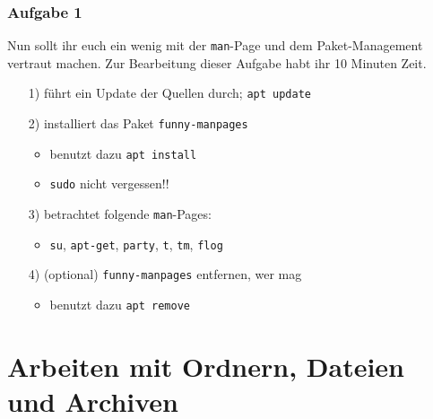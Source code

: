 \documentclass[12pt,utf8, handout]{beamer}
\begin{document}
\begin{frame}
\frametitle{Aufgabe 1}
Nun sollt ihr euch ein wenig mit der \texttt{man}-Page und dem Paket-Management vertraut machen. Zur Bearbeitung dieser Aufgabe habt ihr 10 Minuten Zeit.
\begin{itemize}
	\item[1)] führt ein Update der Quellen durch; \texttt{apt update}
	\item[2)] installiert das Paket \texttt{funny-manpages}
	\begin{itemize}
		\item benutzt dazu \texttt{apt install}
		\item \texttt{sudo} nicht vergessen!!
	\end{itemize}
	\item[3)] betrachtet folgende \texttt{man}-Pages:
	\begin{itemize}
		\item \texttt{su}, \texttt{apt-get}, \texttt{party}, \texttt{t}, \texttt{tm}, \texttt{flog}
	\end{itemize}
	\item[4)] (optional) \texttt{funny-manpages} entfernen, wer mag
	\begin{itemize}
		\item benutzt dazu \texttt{apt remove}
	\end{itemize}
\end{itemize} 
\end{frame}

\section{Arbeiten mit Ordnern, Dateien und Archiven}
\end{document}

